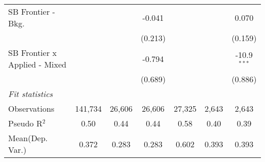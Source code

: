\begin{tabular}{lcccccc}
   SB Frontier - Bkg.            &               &               & -0.041       &               &             & 0.070\\   
                                 &               &               & (0.213)      &               &             & (0.159)\\   
   SB Frontier x Applied - Mixed &               &               & -0.794       &               &             & -10.9$^{***}$\\   
                                 &               &               & (0.689)      &               &             & (0.886)\\   
   \midrule
   \emph{Fit statistics}\\
   Observations                  & 141,734       & 26,606        & 26,606       & 27,325        & 2,643       & 2,643\\  
   Pseudo R$^2$                  & 0.50          & 0.44          & 0.44         & 0.58          & 0.40        & 0.39\\  
Mean(Dep. Var.) & 0.372 & 0.283 & 0.283 & 0.602 & 0.393 & 0.393 \\
   

\end{tabular}
